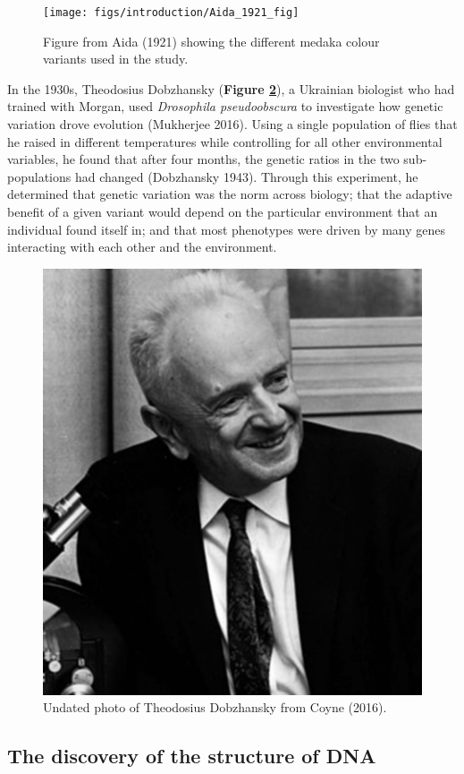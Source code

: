 \documentclass[
]{book}
\begin{document}
\begin{figure}

{\centering \texttt{[image: figs/introduction/Aida\_1921\_fig]} 

}

\caption{Figure from Aida (1921) showing the different medaka colour variants used in the study.}\label{fig:aida-fig}
\end{figure}

In the 1930s, Theodosius Dobzhansky (\textbf{Figure \ref{fig:dobzhansky}}), a Ukrainian biologist who had trained with Morgan, used \emph{Drosophila pseudoobscura} to investigate how genetic variation drove evolution (Mukherjee 2016). Using a single population of flies that he raised in different temperatures while controlling for all other environmental variables, he found that after four months, the genetic ratios in the two sub-populations had changed (Dobzhansky 1943). Through this experiment, he determined that genetic variation was the norm across biology; that the adaptive benefit of a given variant would depend on the particular environment that an individual found itself in; and that most phenotypes were driven by many genes interacting with each other and the environment.



\begin{figure}

{\centering \includegraphics[width=0.5\linewidth]{figs/introduction/Dobzhansky} 

}

\caption{Undated photo of Theodosius Dobzhansky from Coyne (2016).}\label{fig:dobzhansky}
\end{figure}

\hypertarget{the-discovery-of-the-structure-of-dna}{%
\subsection{The discovery of the structure of DNA}\label{the-discovery-of-the-structure-of-dna}}
\end{document}
